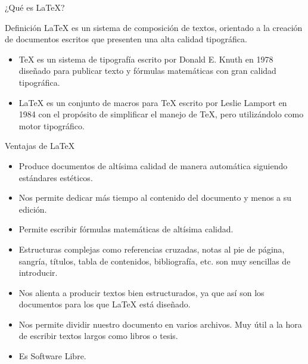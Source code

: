 \documentclass[11pt]{beamer}
\begin{document}
\begin{frame}{¿Qué es {\LaTeX}?}

\begin{block}{Definición}
{\LaTeX} es un sistema de composición de textos, orientado a la creación de documentos escritos que presenten una alta calidad tipográfica.
\end{block}

\begin{itemize}
\item \TeX{} es un sistema de tipografía escrito por Donald E. Knuth en 1978 diseñado para publicar texto y fórmulas matemáticas con gran calidad tipográfica.
\item {\LaTeX} es un conjunto de macros para {\TeX} escrito por Leslie Lamport en 1984 con el propósito de simplificar el manejo de {\TeX}, pero utilizándolo como motor tipográfico.
\end{itemize}
\end{frame}

\begin{frame}{Ventajas de \LaTeX}
\begin{itemize}[<+- | alert@+>]
  \item Produce documentos de altísima calidad de manera automática siguiendo estándares estéticos.
  \item Nos permite dedicar más tiempo al contenido del documento y menos a su edición.
  \item Permite escribir fórmulas matemáticas de altísima calidad.
  \item Estructuras complejas como referencias cruzadas, notas al pie de página, sangría, títulos, tabla de contenidos, bibliografía, etc. son muy sencillas de introducir.
  \item Nos alienta a producir textos bien estructurados, ya que así son los documentos para los que \LaTeX{} está diseñado.
  \item Nos permite dividir nuestro documento en varios archivos. Muy útil a la hora de escribir textos largos como libros o tesis.
  \item Es Software Libre.
\end{itemize}
\end{frame}
\end{document}

